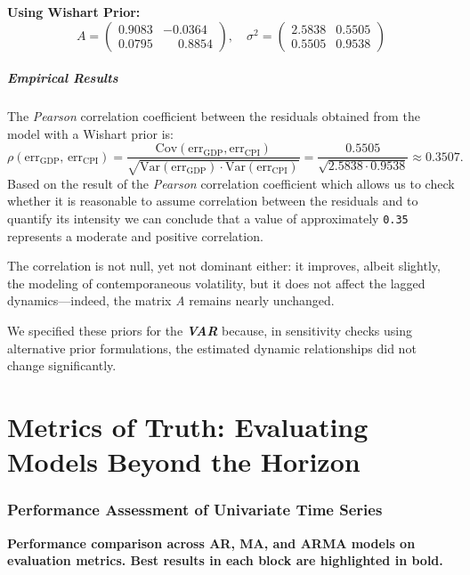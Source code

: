 \documentclass{Configuration_Files/PoliMi3i_thesis}
\begin{document}
\textbf{Using Wishart Prior:}
\[
A =
\begin{pmatrix}
0.9083 & -0.0364 \\
0.0795 & \phantom{-}0.8854
\end{pmatrix}, \quad
\sigma^2 =
\begin{pmatrix}
2.5838 & 0.5505 \\
0.5505 & 0.9538
\end{pmatrix}
\]

\paragraph{Empirical Results}
The \textit{Pearson} correlation coefficient between the residuals obtained from the model with a Wishart prior is:
\[
\rho(\text{err}_{\mathrm{GDP}},\,\text{err}_{\mathrm{CPI}}) 
= \frac{\text{Cov}(\text{err}_{\mathrm{GDP}}, \text{err}_{\mathrm{CPI}})}{
\sqrt{\text{Var}(\text{err}_{\mathrm{GDP}}) \cdot \text{Var}(\text{err}_{\mathrm{CPI}})}} 
= \frac{0.5505}{\sqrt{2.5838 \cdot 0.9538}} \approx 0.3507.
\]
Based on the result of the \textit{Pearson} correlation coefficient which allows us to check whether it is reasonable to assume correlation between the residuals and to quantify its intensity we can conclude that a value of approximately \texttt{0.35} represents a moderate and positive correlation.

The correlation is not null, yet not dominant either: it improves, albeit slightly, the modeling of contemporaneous volatility, but it does not affect the lagged dynamics—indeed, the matrix \textit{A} remains nearly unchanged.

We specified these priors for the \textbf{\textit{VAR}} because, in sensitivity checks using alternative prior formulations, the estimated dynamic relationships did not change significantly.

\chapter{Metrics of Truth: Evaluating Models Beyond the Horizon}
\subsection{Performance Assessment of Univariate Time Series}
\textbf{Performance comparison across AR, MA, and ARMA models on evaluation metrics. Best results in each block are highlighted in bold.}
\end{document}
